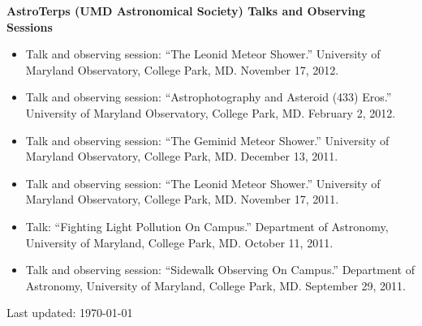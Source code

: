 \documentclass[margin]{res}
\begin{document}
\begin{resume}
	     \textbf{AstroTerps (UMD Astronomical Society) Talks and Observing Sessions}
	     \begin{itemize}
	     \item Talk and observing session: ``The Leonid Meteor Shower.'' University of Maryland Observatory, College Park, MD. November 17, 2012.
	       \item Talk and observing session: ``Astrophotography and Asteroid (433) Eros.'' University of Maryland Observatory, College Park, MD. February 2, 2012.		
	       \item Talk and observing session: ``The Geminid Meteor Shower.'' University of Maryland Observatory, College Park, MD. December 13, 2011.
	       \item Talk and observing session: ``The Leonid Meteor Shower.'' University of Maryland Observatory, College Park, MD. November 17, 2011.
	       \item Talk: ``Fighting Light Pollution On Campus.'' Department of Astronomy, University of Maryland, College Park, MD. October 11, 2011.
	       \item Talk and observing session: ``Sidewalk Observing On Campus.'' Department of Astronomy, University of Maryland, College Park, MD. September 29, 2011.\\
	       \end{itemize}
\vfill \hfill {\scriptsize Last updated: \today}
\end{resume}
\end{document}
